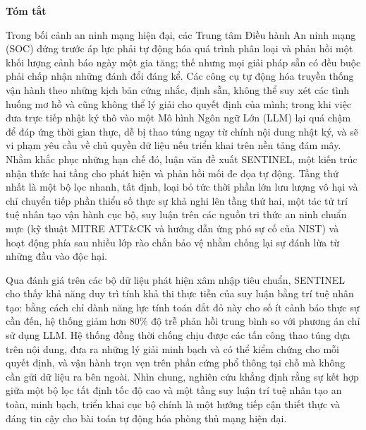 \documentclass[12pt,a4paper]{report}
\begin{document}
\pagestyle{fancy}
\setcounter{page}{1} %

\newpage
{}
\begin{center}
    {\Large\textbf{Tóm tắt}}
\end{center}
\vspace{0.5cm}

\begin{singlespace}
Trong bối cảnh an ninh mạng hiện đại, các Trung tâm Điều hành An ninh mạng (SOC) đứng trước áp lực phải tự động hóa quá trình phân loại và phản hồi một khối lượng cảnh báo ngày một gia tăng; thế nhưng mọi giải pháp sẵn có đều buộc phải chấp nhận những đánh đổi đáng kể. Các công cụ tự động hóa truyền thống vận hành theo những kịch bản cứng nhắc, định sẵn, không thể suy xét các tình huống mơ hồ và cũng không thể lý giải cho quyết định của mình; trong khi việc đưa trực tiếp nhật ký thô vào một Mô hình Ngôn ngữ Lớn (LLM) lại quá chậm để đáp ứng thời gian thực, dễ bị thao túng ngay từ chính nội dung nhật ký, và sẽ vi phạm yêu cầu về chủ quyền dữ liệu nếu triển khai trên nền tảng đám mây. Nhằm khắc phục những hạn chế đó, luận văn đề xuất SENTINEL, một kiến trúc nhận thức hai tầng cho phát hiện và phản hồi mối đe dọa tự động. Tầng thứ nhất là một bộ lọc nhanh, tất định, loại bỏ tức thời phần lớn lưu lượng vô hại và chỉ chuyển tiếp phần thiểu số thực sự khả nghi lên tầng thứ hai, một tác tử trí tuệ nhân tạo vận hành cục bộ, suy luận trên các nguồn tri thức an ninh chuẩn mực (kỹ thuật MITRE ATT\&CK và hướng dẫn ứng phó sự cố của NIST) và hoạt động phía sau nhiều lớp rào chắn bảo vệ nhằm chống lại sự đánh lừa từ những đầu vào độc hại.

Qua đánh giá trên các bộ dữ liệu phát hiện xâm nhập tiêu chuẩn, SENTINEL cho thấy khả năng duy trì tính khả thi thực tiễn của suy luận bằng trí tuệ nhân tạo: bằng cách chỉ dành năng lực tính toán đắt đỏ này cho số ít cảnh báo thực sự cần đến, hệ thống giảm hơn $80\%$ độ trễ phản hồi trung bình so với phương án chỉ sử dụng LLM. Hệ thống đồng thời chống chịu được các tấn công thao túng dựa trên nội dung, đưa ra những lý giải minh bạch và có thể kiểm chứng cho mỗi quyết định, và vận hành trọn vẹn trên phần cứng phổ thông tại chỗ mà không cần gửi dữ liệu ra bên ngoài. Nhìn chung, nghiên cứu khẳng định rằng sự kết hợp giữa một bộ lọc tất định tốc độ cao và một tầng suy luận trí tuệ nhân tạo an toàn, minh bạch, triển khai cục bộ chính là một hướng tiếp cận thiết thực và đáng tin cậy cho bài toán tự động hóa phòng thủ mạng hiện đại.


\end{singlespace}
\end{document}
